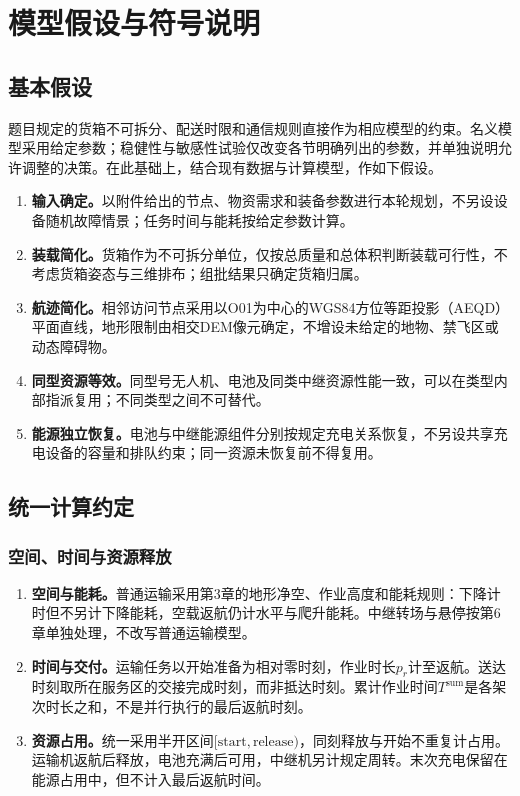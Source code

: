 \section{模型假设与符号说明}
\label{sec:assumptions_symbols}

\subsection{基本假设}

题目规定的货箱不可拆分、配送时限和通信规则直接作为相应模型的约束。名义模型采用给定参数；稳健性与敏感性试验仅改变各节明确列出的参数，并单独说明允许调整的决策。在此基础上，结合现有数据与计算模型，作如下假设。

\begin{enumerate}[label=\textbf{假设\arabic*.},leftmargin=3.5em]
\item \textbf{输入确定。}以附件给出的节点、物资需求和装备参数进行本轮规划，不另设设备随机故障情景；任务时间与能耗按给定参数计算。
\item \textbf{装载简化。}货箱作为不可拆分单位，仅按总质量和总体积判断装载可行性，不考虑货箱姿态与三维排布；组批结果只确定货箱归属。
\item \textbf{航迹简化。}相邻访问节点采用以O01为中心的WGS84方位等距投影（AEQD）平面直线，地形限制由相交DEM像元确定，不增设未给定的地物、禁飞区或动态障碍物。
\item \textbf{同型资源等效。}同型号无人机、电池及同类中继资源性能一致，可以在类型内部指派复用；不同类型之间不可替代。
\item \textbf{能源独立恢复。}电池与中继能源组件分别按规定充电关系恢复，不另设共享充电设备的容量和排队约束；同一资源未恢复前不得复用。
\end{enumerate}

\subsection{统一计算约定}
\subsubsection{空间、时间与资源释放}
\begin{enumerate}[label=(\arabic*),leftmargin=3.0em]
\item \textbf{空间与能耗。}普通运输采用第3章的地形净空、作业高度和能耗规则：下降计时但不另计下降能耗，空载返航仍计水平与爬升能耗。中继转场与悬停按第6章单独处理，不改写普通运输模型。
\item \textbf{时间与交付。}运输任务以开始准备为相对零时刻，作业时长$p_r$计至返航。送达时刻取所在服务区的交接完成时刻，而非抵达时刻。累计作业时间$T^{\mathrm{sum}}$是各架次时长之和，不是并行执行的最后返航时刻。
\item \textbf{资源占用。}统一采用半开区间$[\mathrm{start},\mathrm{release})$，同刻释放与开始不重复计占用。运输机返航后释放，电池充满后可用，中继机另计规定周转。末次充电保留在能源占用中，但不计入最后返航时间。
\end{enumerate}
